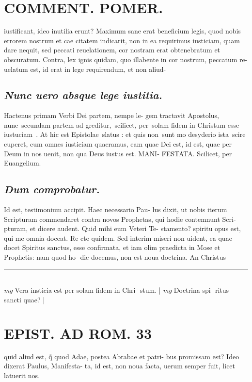 \documentclass{article}
\begin{document}
\begin{pages}
\section*{COMMENT. POMER.  }\pstart iustificant, ideo inutilia erunt? Maximum sane erat beneficium legis, quod nobis errorem nostrum et cae citatem indicarit, non in ea requirimus iusticiam, quam dare nequit, sed peccati reuelationem, cor nostram erat obtenebratum et obscuratum. Contra, lex ignis quidam, quo illabente in cor nostrum, peccatum re- uelatum est, id erat in lege requirendum, et non aliud-  \pend
{}
{}
\subsection*{\textit{Nunc uero absque lege iustitia. }}\pstart Hactenus primam Verbi Dei partem, nempe le- gem tractavit Apostolus, nunc secundam partem ad greditur, scilicet, per solam fidem in Christum esse iustuciam . At hic est Epistolae slatus : et quis non sunt mo desyderio ista scire cuperet, cum omnes iusticiam quaeramus, eam quae Dei est, id est, quae per Deum in nos uenit, non qua Deus iustus est. MANI- FESTATA. Scilicet, per Euangelium.   \pend
{}
{}
\subsection*{\textit{Dum comprobatur. }}\pstart Id est, testimonium accipit. Haec necessario Pau- lus dixit, ut nobis iterum Scripturam commendaret contra novos Prophetas, qui hodie contemnunt Scri- pturam, et dicere audent. Quid mihi eum Veteri Te- stamento? spiritu opus est, qui me omnia doceat. Re cte quidem. Sed interim miseri non uident, ea quae docet Spiritus sanctus, esse confirmata, et iam olim praedicta in Mose et Prophetis: nam quod ho- die docemus, non est noua doctrina. An Christus  \pend
\vspace{0.5cm}\noindent
\vspace{0.2cm}\rule{1cm}{0.2pt}\\ 
\hspace{0.2cm}\textit{mg}
\footnotesize Vera insticia est per solam fidem in Chri- stum.  
\normalsize| 
\hspace{0.2cm}\textit{mg}
\footnotesize Doctrina spi- ritus sancti quae? 
\normalsize| 
\section*{EPIST. AD ROM.  33 }
\marginpar{[ p.]}\pstart quid aliud est, q̃ quod Adae, postea Abrabae et patri- bus promissam est? Ideo dixerat Paulus, Manifesta- ta, id est, non noua facta, uerum semper fuit, licet latuerit nos.   \pend
{}
{}

\end{pages}
\end{document}

